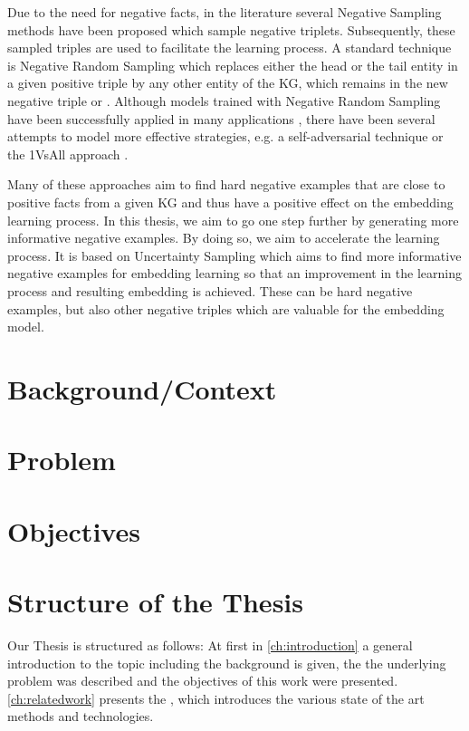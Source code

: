 Due to the need for negative facts, in the literature several Negative Sampling methods have been proposed which sample negative triplets.
Subsequently, these sampled triples are used to facilitate the learning process. 
A standard technique is Negative Random Sampling which replaces either the head or the tail entity in a given positive triple   by any other entity of the \ac{KG}, which remains in the new negative triple  or . 
Although models trained with Negative Random Sampling have been successfully applied in many applications \cite{TransE}, there have been several attempts to model more effective strategies, e.g. 
a self-adversarial technique \cite{RotatE} or the 1VsAll approach \cite{ConvE}.

Many of these approaches aim to find hard negative examples that are close to positive facts from a given \ac{KG} and thus have a positive effect on the embedding learning process. 
In this thesis, we aim to go one step further by generating more informative negative examples. 
By doing so, we aim to accelerate the learning process.
It is based on Uncertainty Sampling which aims to
find more informative negative examples for embedding learning so that an improvement in the learning process and resulting embedding is achieved.
These can be hard negative examples, but also other negative triples which are valuable for the embedding model.


\section{Background/Context}

\section{Problem}

\section{Objectives}


\section{Structure of the Thesis}

Our Thesis is structured as follows:
At first in \autoref{ch:introduction} a general introduction to the topic including the background is given, the 
the underlying problem was described and the objectives of this work were presented.
\autoref{ch:relatedwork} presents the , which introduces the various state of the art methods and technologies. 

